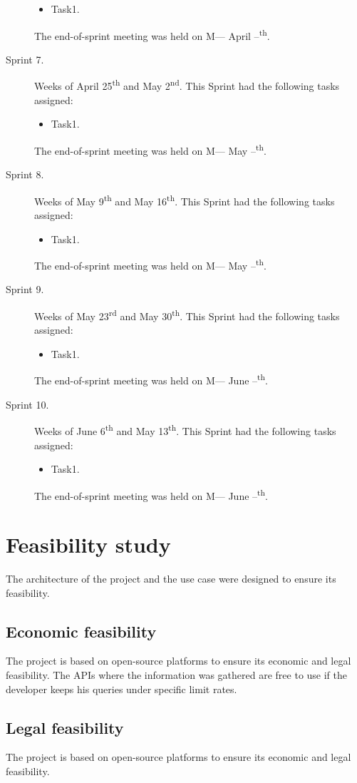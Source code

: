 \begin{description}
\begin{itemize}
		\item Task1.
	\end{itemize}
	The end-of-sprint meeting was held on M--- April --\textsuperscript{th}.
	\item[Sprint 7.] Weeks of April 25\textsuperscript{th} and May 2\textsuperscript{nd}. This Sprint had the following tasks assigned:
	\begin{itemize}
		\item Task1.
	\end{itemize}
	The end-of-sprint meeting was held on M--- May --\textsuperscript{th}.
	\item[Sprint 8.] Weeks of May 9\textsuperscript{th} and May 16\textsuperscript{th}. This Sprint had the following tasks assigned:
	\begin{itemize}
		\item Task1.
	\end{itemize}
	The end-of-sprint meeting was held on M--- May --\textsuperscript{th}.
	\item[Sprint 9.] Weeks of May 23\textsuperscript{rd} and May 30\textsuperscript{th}. This Sprint had the following tasks assigned:
	\begin{itemize}
		\item Task1.
	\end{itemize}
	The end-of-sprint meeting was held on M--- June --\textsuperscript{th}.
	\item[Sprint 10.] Weeks of June 6\textsuperscript{th} and May 13\textsuperscript{th}. This Sprint had the following tasks assigned:
	\begin{itemize}
		\item Task1.
	\end{itemize}
	The end-of-sprint meeting was held on M--- June --\textsuperscript{th}.
\end{description}

\section{Feasibility study}
\nonzeroparskip The architecture of the project and the use case were designed to ensure its feasibility.

\subsection{Economic feasibility}
\nonzeroparskip The project is based on open-source platforms to ensure its economic and legal feasibility. The APIs where the information was gathered are free to use if the developer keeps his queries under specific limit rates.

\subsection{Legal feasibility}
\nonzeroparskip The project is based on open-source platforms to ensure its economic and legal feasibility. 

